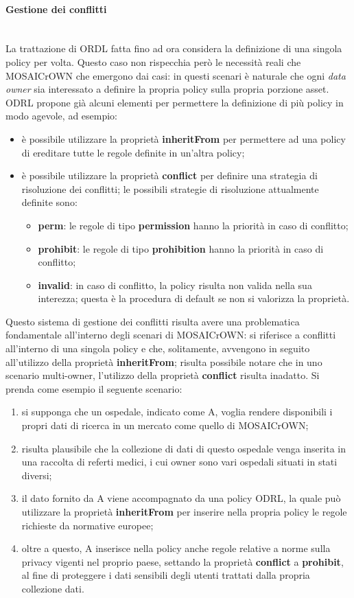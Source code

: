 \documentclass[12pt,a4paper,twoside]{book}
\begin{document}
\paragraph{Gestione dei conflitti}\mbox{}\\
La trattazione di ORDL fatta fino ad ora considera la definizione di una singola policy per volta. Questo caso non rispecchia però le necessità reali che MOSAICrOWN che emergono dai casi: in questi scenari è naturale che ogni \textit{data owner} sia interessato a definire la propria policy sulla propria porzione asset.\\
ODRL propone già alcuni elementi per permettere la definizione di più policy in modo agevole, ad esempio: 
\begin{itemize}
	\item è possibile utilizzare la proprietà \textbf{inheritFrom} per permettere ad una policy di ereditare tutte le regole definite in un'altra policy;
	\item è possibile utilizzare la proprietà \textbf{conflict} per definire una strategia di risoluzione dei conflitti; le possibili strategie di risoluzione attualmente definite sono:
	\begin{itemize}
		\item \textbf{perm}: le regole di tipo \textbf{permission} hanno la priorità in caso di conflitto;
		\item \textbf{prohibit}: le regole di tipo \textbf{prohibition} hanno la priorità in caso di conflitto;
		\item \textbf{invalid}: in caso di conflitto, la policy risulta non valida nella sua interezza; questa è la procedura di default se non si valorizza la proprietà.
	\end{itemize}
\end{itemize}
Questo sistema di gestione dei conflitti risulta avere una problematica fondamentale all'interno degli scenari di MOSAICrOWN: si riferisce a conflitti all'interno di una singola policy e che, solitamente, avvengono in seguito all'utilizzo della proprietà \textbf{inheritFrom}; risulta possibile notare che in uno scenario multi-owner, l'utilizzo della proprietà \textbf{conflict} risulta inadatto. Si prenda come esempio il seguente scenario:
\begin{enumerate}
	\item si supponga che un ospedale, indicato come A, voglia rendere disponibili i propri dati di ricerca in un mercato come quello di MOSAICrOWN;
	\item risulta plausibile che la collezione di dati di questo ospedale venga inserita in una raccolta di referti medici, i cui owner sono vari ospedali situati in stati diversi;
	\item il dato fornito da A viene accompagnato da una policy ODRL, la quale può utilizzare la proprietà \textbf{inheritFrom} per inserire nella propria policy le regole richieste da normative europee;
	\item oltre a questo, A inserisce nella policy anche regole relative a norme sulla privacy vigenti nel proprio paese, settando la proprietà \textbf{conflict} a \textbf{prohibit}, al fine di proteggere i dati sensibili degli utenti trattati dalla propria collezione dati.
\end{enumerate}
\end{document}

